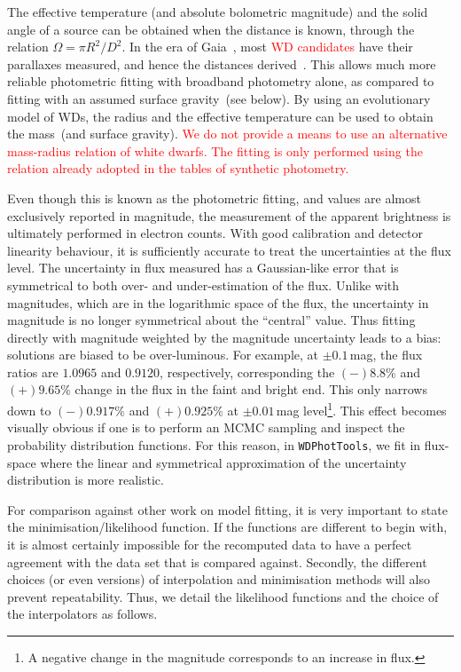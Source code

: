 \documentclass[fleqn,usenatbib]{rasti}
\begin{document}
The effective temperature (and absolute bolometric magnitude) and the solid
angle of a source can be obtained when the distance is known, through the
relation $\Omega = \pi R^2 / D^2$. In the era of
Gaia~\citep{2021A&A...649A...1G}, most \textcolor{red}{WD candidates} have
their parallaxes measured, and hence the distances
derived~\citep{2021AJ....161..147B}. This allows much more reliable photometric
fitting with broadband photometry alone, as compared to fitting with an assumed
surface gravity~(see below). By using an evolutionary model of WDs, the radius
and the effective temperature can be used to obtain the mass~(and surface
gravity). \textcolor{red}{We do not provide a means to use an alternative
mass-radius relation of white dwarfs. The fitting is only performed using the
relation already adopted in the tables of synthetic photometry.}

Even though this is known as the photometric fitting, and values are almost
exclusively reported in magnitude, the measurement of the apparent brightness
is ultimately performed in electron counts. With good calibration and detector
linearity behaviour, it is sufficiently accurate to treat the uncertainties
at the flux level. The uncertainty in flux measured has a Gaussian-like error
that is symmetrical to both over- and under-estimation of the flux. Unlike
with magnitudes, which are in the logarithmic space of the flux, the
uncertainty in magnitude is no longer symmetrical about the ``central'' value.
Thus fitting directly with magnitude weighted by the magnitude uncertainty
leads to a bias: solutions are biased to be over-luminous. For example, at
$\pm0.1$\,mag, the flux ratios are $1.0965$ and $0.9120$, respectively,
corresponding the $(-)8.8\%$ and $(+)9.65\%$ change in the flux in the faint
and bright end. This only narrows down to $(-)0.917\%$ and $(+)0.925\%$ at
$\pm0.01\,$mag level\footnote{A negative change in the magnitude corresponds
to an increase in flux.}. This effect becomes visually obvious if one is to
perform an MCMC sampling and inspect the probability distribution functions.
For this reason, in \verb+WDPhotTools+, we fit in flux-space where the linear
and symmetrical approximation of the uncertainty distribution is more
realistic.

For comparison against other work on model fitting, it is very important to
state the minimisation/likelihood function. If the functions are different to
begin with, it is almost certainly impossible for the recomputed data to
have a perfect agreement with the data set that is compared against. Secondly, the
different choices (or even versions) of interpolation and minimisation methods
will also prevent repeatability. Thus, we detail the likelihood functions
and the choice of the interpolators as follows.
\end{document}
